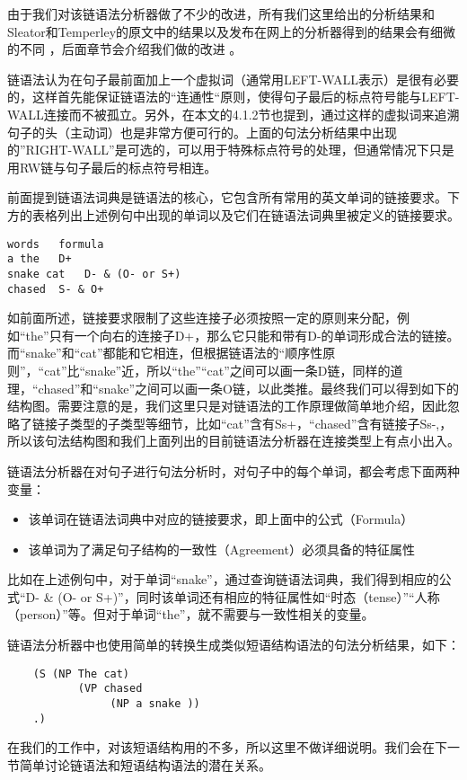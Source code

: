 由于我们对该链语法分析器做了不少的改进，所有我们这里给出的分析结果和Sleator和Temperley的原文中的结果以及发布在网上的分析器得到的结果会有细微的不同 ，后面章节会介绍我们做的改进 。

链语法认为在句子最前面加上一个虚拟词（通常用LEFT-WALL表示）是很有必要的，这样首先能保证链语法的“连通性“原则，使得句子最后的标点符号能与LEFT-WALL连接而不被孤立。另外，在本文的4.1.2节也提到，通过这样的虚拟词来追溯句子的头（主动词）也是非常方便可行的。上面的句法分析结果中出现的”RIGHT-WALL”是可选的，可以用于特殊标点符号的处理，但通常情况下只是用RW链与句子最后的标点符号相连。

前面提到链语法词典是链语法的核心，它包含所有常用的英文单词的链接要求。下方的表格列出上述例句中出现的单词以及它们在链语法词典里被定义的链接要求。
\begin{verbatim}
words	formula
a the	D+
snake cat	D- & (O- or S+)
chased	S- & O+
\end{verbatim}
如前面所述，链接要求限制了这些连接子必须按照一定的原则来分配，例如“the”只有一个向右的连接子D+，那么它只能和带有D-的单词形成合法的链接。而“snake”和“cat”都能和它相连，但根据链语法的“顺序性原则”，“cat”比“snake”近，所以“the”“cat”之间可以画一条D链，同样的道理，“chased”和“snake”之间可以画一条O链，以此类推。最终我们可以得到如下的结构图。需要注意的是，我们这里只是对链语法的工作原理做简单地介绍，因此忽略了链接子类型的子类型等细节，比如“cat”含有Ss+，“chased”含有链接子Ss-,，所以该句法结构图和我们上面列出的目前链语法分析器在连接类型上有点小出入。 

链语法分析器在对句子进行句法分析时，对句子中的每个单词，都会考虑下面两种变量：
\begin{itemize}
\item 该单词在链语法词典中对应的链接要求，即上面中的公式（Formula）
\item 该单词为了满足句子结构的一致性（Agreement）必须具备的特征属性
\end{itemize}

比如在上述例句中，对于单词“snake”，通过查询链语法词典，我们得到相应的公式“D- \& (O- or S+)”，同时该单词还有相应的特征属性如“时态（tense）”“人称（person）”等。但对于单词“the”，就不需要与一致性相关的变量。

链语法分析器中也使用简单的转换生成类似短语结构语法的句法分析结果，如下：
\begin{verbatim}
    (S (NP The cat)
           (VP chased
                (NP a snake ))
    .)
\end{verbatim}
在我们的工作中，对该短语结构用的不多，所以这里不做详细说明。我们会在下一节简单讨论链语法和短语结构语法的潜在关系。

